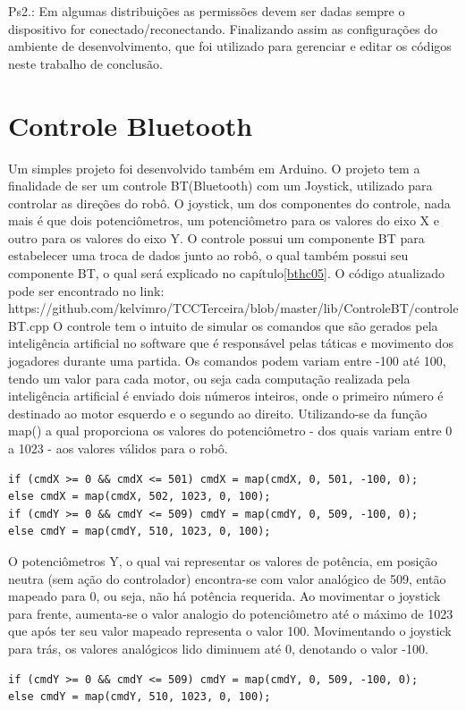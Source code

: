 \documentclass[a4paper,12pt,portuguese]{ufms-cpcx}
\begin{document}
Ps2.: Em algumas distribuições as permissões devem ser dadas sempre o dispositivo for conectado/reconectando.
Finalizando assim as configurações do ambiente de desenvolvimento, que foi utilizado para gerenciar e editar os códigos neste trabalho de conclusão.

\chapter{Controle Bluetooth}
Um simples projeto foi desenvolvido também em Arduino. O projeto tem a finalidade de ser um controle BT(Bluetooth) com um Joystick, utilizado para controlar as direções do robô. 
O joystick, um dos componentes do controle, nada mais é que dois potenciômetros, um potenciômetro para os valores do eixo X e outro para os valores do eixo Y. 
O controle possui um componente BT para estabelecer uma troca de dados junto ao robô, o qual também possui seu componente BT, o qual será explicado no capítulo\ref{bthc05}.
O código atualizado pode ser encontrado no link: https://github.com/kelvimro/TCCTerceira/blob/master/lib/ControleBT/controleBT.cpp 
O controle tem o intuito de simular os comandos que são gerados pela inteligência artificial no software que é responsável pelas táticas e movimento dos jogadores durante uma partida.
Os comandos podem variam entre -100 até 100, tendo um valor para cada motor, ou seja cada computação realizada pela inteligência artificial é enviado dois números inteiros, onde o primeiro número é destinado ao motor esquerdo e o segundo ao direito.
Utilizando-se da função map() a qual proporciona os valores do potenciômetro - dos quais variam entre 0 a 1023 - aos valores válidos para o robô.
\begin{lstlisting}
if (cmdX >= 0 && cmdX <= 501) cmdX = map(cmdX, 0, 501, -100, 0);
else cmdX = map(cmdX, 502, 1023, 0, 100);
if (cmdY >= 0 && cmdY <= 509) cmdY = map(cmdY, 0, 509, -100, 0);
else cmdY = map(cmdY, 510, 1023, 0, 100);
\end{lstlisting}
O potenciômetros Y, o qual vai representar os valores de potência, em posição neutra (sem ação do controlador) encontra-se com valor analógico de 509, então mapeado para 0, ou seja, não há potência requerida.
Ao movimentar o joystick para frente, aumenta-se o valor analogio do potenciômetro até o máximo de 1023 que após ter seu valor mapeado representa o valor 100.
Movimentando o joystick para trás, os valores analógicos lido diminuem até 0, denotando o valor -100. 
\begin{lstlisting}
if (cmdY >= 0 && cmdY <= 509) cmdY = map(cmdY, 0, 509, -100, 0);
else cmdY = map(cmdY, 510, 1023, 0, 100);
\end{lstlisting}
\end{document}
